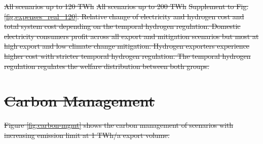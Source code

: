 \documentclass[5p,numafflabel]{elsarticle}
\providecommand{\DIFdeltex}[1]{{\protect\color{red}\sout{#1}}}                      %
\providecommand{\DIFdelFL}[1]{\DIFdel{#1}} %
\providecommand{\DIFdel}[1]{\texorpdfstring{\DIFdeltex{#1}}{}} %
\begin{document}
{%
\DIFdelFL{All scenarios up to 120 TWh}}
{%
\DIFdelFL{All scenarios up to 200 TWh}}
{%
\DIFdelFL{Supplement to Fig. \ref{fig:expenses_real_120}. Relative change of electricity and hydrogen cost and total system cost depending on the temporal hydrogen regulation. Domestic electricity consumers profit across all export and mitigation scenarios but most at high export and low climate change mitigation. Hydrogen exporters experience higher cost with stricter temporal hydrogen regulation. The temporal hydrogen regulation regulates the welfare distribution between both groups.}}


\section{\DIFdel{Carbon Management}}
\addtocounter{section}{-1}%

\DIFdel{Figure \ref{fig:carbon-mgmt} shows the carbon management of scenarios with increasing emission limit at 1 TWh/a export volume.
}%
\end{document}
